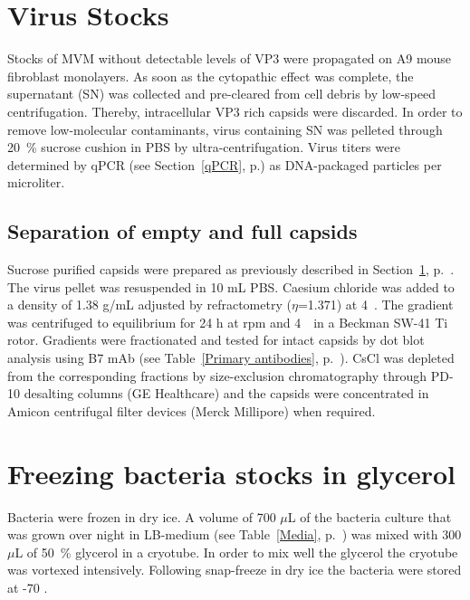 
\section{Virus Stocks}
\label{Virus Stocks}
Stocks of MVM without detectable levels of VP3 were propagated on A9 mouse fibroblast monolayers. As soon as the cytopathic effect was complete, the supernatant (SN) was collected and pre-cleared from cell debris by low-speed centrifugation. Thereby, intracellular VP3 rich capsids were discarded. In order to remove low-molecular contaminants, virus containing SN was pelleted through 20~\% sucrose cushion in PBS by ultra-centrifugation. Virus titers were determined by qPCR (see Section~\ref{qPCR}, p.\pageref{qPCR}) as DNA-packaged particles per microliter.   


\subsection{Separation of empty and full capsids}

Sucrose purified capsids were prepared as previously described in Section~\ref{Virus Stocks}, p.~\pageref{Virus Stocks}. The virus pellet was resuspended in 10 mL PBS. Caesium chloride was added to a density of 1.38 g/mL adjusted by refractometry ($\eta$=1.371) at 4~\textcelsius. The gradient was centrifuged to equilibrium for 24 h at  rpm and 4~\textcelsius~in a Beckman SW-41 Ti rotor. Gradients were fractionated and tested for intact capsids by dot blot analysis using B7 mAb (see Table~\ref{Primary antibodies}, p.~\pageref{Primary antibodies}). CsCl was depleted from the corresponding fractions by size-exclusion chromatography through PD-10 desalting columns (GE Healthcare) and the capsids were concentrated in Amicon\textsuperscript{\textregistered} centrifugal filter devices (Merck Millipore) when required.          
   
   


\section{Freezing bacteria stocks in glycerol}
Bacteria were frozen in dry ice. A volume of 700 $\mu$L of the bacteria culture that was grown over night in LB-medium (see Table~\ref{Media}, p.~\pageref{Media}) was mixed with 300 $\mu$L of 50~\% glycerol in a cryotube. In order to mix well the glycerol the cryotube was vortexed intensively. Following snap-freeze in dry ice the bacteria were stored at -70 \textcelsius.


